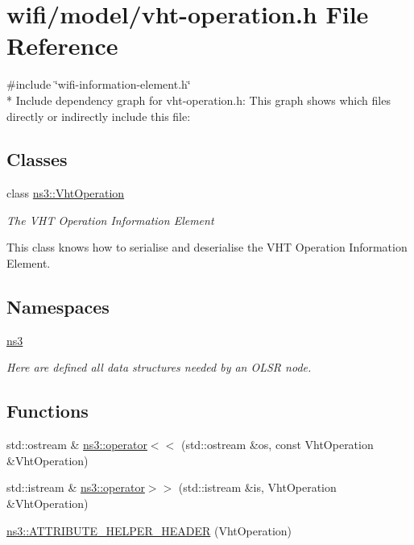 \hypertarget{vht-operation_8h}{}\section{wifi/model/vht-\/operation.h File Reference}
\label{vht-operation_8h}
{\ttfamily \#include \char`\"{}wifi-\/information-\/element.\+h\char`\"{}}\\*
Include dependency graph for vht-\/operation.h\+:
This graph shows which files directly or indirectly include this file\+:
\subsection*{Classes}
\begin{DoxyCompactItemize}
\item 
class \hyperlink{classns3_1_1VhtOperation}{ns3\+::\+Vht\+Operation}
\begin{DoxyCompactList}\small\item\em The V\+HT Operation Information Element

This class knows how to serialise and deserialise the V\+HT Operation Information Element. \end{DoxyCompactList}\end{DoxyCompactItemize}
\subsection*{Namespaces}
\begin{DoxyCompactItemize}
\item 
 \hyperlink{namespacens3}{ns3}
\begin{DoxyCompactList}\small\item\em Here are defined all data structures needed by an O\+L\+SR node. \end{DoxyCompactList}\end{DoxyCompactItemize}
\subsection*{Functions}
\begin{DoxyCompactItemize}
\item 
std\+::ostream \& \hyperlink{namespacens3_a130046800fb142349fb2315adcb8fbef}{ns3\+::operator$<$$<$} (std\+::ostream \&os, const Vht\+Operation \&Vht\+Operation)
\item 
std\+::istream \& \hyperlink{namespacens3_a1d29944d7197360f05e4265bfc8069fa}{ns3\+::operator$>$$>$} (std\+::istream \&is, Vht\+Operation \&Vht\+Operation)
\item 
\hyperlink{namespacens3_aa5a097354803ed13fb512d3ba22fc346}{ns3\+::\+A\+T\+T\+R\+I\+B\+U\+T\+E\+\_\+\+H\+E\+L\+P\+E\+R\+\_\+\+H\+E\+A\+D\+ER} (Vht\+Operation)
\end{DoxyCompactItemize}
